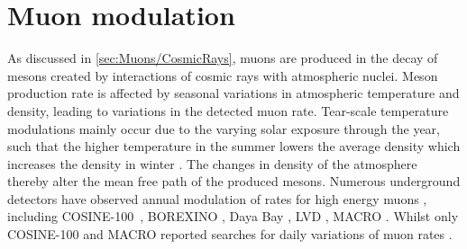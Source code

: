 \section{Muon modulation}\label{sec:Muons/MuonModulation}
As discussed in \autoref{sec:Muons/CosmicRays}, muons are produced in the decay of mesons created by interactions of cosmic rays with atmospheric nuclei. Meson production rate is affected by seasonal variations in atmospheric temperature and density, leading to variations in the detected muon rate. Tear-scale temperature modulations mainly occur due to the varying solar exposure
through the year, such that the higher temperature in the summer lowers the average density
which increases the density in winter \cite{COSINE-100:2020jml}. The changes in density of the atmosphere thereby alter the mean free path of the produced mesons. Numerous underground detectors have observed annual modulation of rates for high energy muons \cite{Gaisser_Engel_Resconi_2016}, including COSINE-100~\cite{COSINE-100:2020jml}, BOREXINO \cite{Borexino:2018pev}, Daya Bay \cite{DayaBay:2017lpf}, LVD \cite{PhysRevD.58.092005}, MACRO \cite{AMBROSIO1997109}. Whilst only COSINE-100 and MACRO reported searches for daily variations of muon rates \cite{COSINE-100:2020jml,AMBROSIO1997109}.

